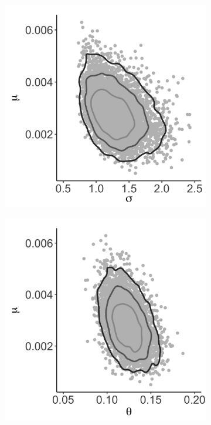 \documentclass{uwstat572}
\begin{document}
\begin{figure}[t!]
\begin{subfigure}[b]{0.3\textwidth}
		\caption{}
		\label{fig:sigma_density}
	\end{subfigure} 
	\medskip
		\begin{subfigure}[b]{0.3\textwidth}
		\includegraphics[width=\textwidth]{figures/figure_2d.png}
		\caption{}
		\label{fig:muSigma}
	\end{subfigure}
	\hfill
	\begin{subfigure}[b]{0.3\textwidth}
		\includegraphics[width=\textwidth]{figures/figure_2e.png}

\end{subfigure}
\end{figure}
\end{document}
